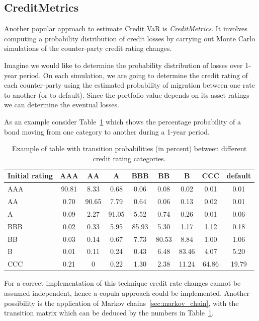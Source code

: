 \subsection{CreditMetrics}
Another popular approach to estimate Credit VaR is \emph{CreditMetrics}. It involves computing a probability distribution of credit losses by carrying out Monte Carlo simulations of the counter-party credit rating changes.

Imagine we would like to determine the probability distribution of losses over 1-year period. On each simulation, we are going to determine the credit rating of each counter-party using the estimated probability of migration between one rate to another (or to default). Since the portfolio value depends on its asset ratings we can determine the eventual losses. 

As an example consider Table~\ref{tab:credit_ratings} which shows the percentage probability of a bond moving from one category to another during a 1-year period.

\begin{table}[htb]
\centering
\begin{tabular}{|l|c|c|c|c|c|c|c|c|}
\hline
Initial rating & AAA & AA & A & BBB & BB & B & CCC & default \\
\hline
\hline
AAA & 90.81 & 8.33 & 0.68 & 0.06 & 0.08 & 0.02 & 0.01& 0.01 \\ 
\hline
AA & 0.70 & 90.65 & 7.79 & 0.64 & 0.06 & 0.13 & 0.02 & 0.01 \\ 
\hline
A & 0.09 & 2.27 & 91.05 & 5.52 & 0.74 & 0.26 & 0.01 & 0.06 \\ 
\hline
BBB & 0.02 & 0.33 & 5.95 & 85.93 & 5.30 & 1.17 & 1.12 & 0.18 \\
\hline
BB & 0.03 & 0.14 & 0.67 & 7.73 & 80.53 & 8.84 & 1.00 & 1.06 \\
\hline
B & 0.01 & 0.11 & 0.24 & 0.43 & 6.48 & 83.46 & 4.07 & 5.20 \\
\hline
CCC & 0.21 & 0 & 0.22 & 1.30 & 2.38 & 11.24 & 64.86 & 19.79 \\		
\hline
\end{tabular}
\caption{Example of table with transition probabilities (in percent) between different credit rating categories.}
\label{tab:credit_ratings}
\end{table}

For a correct implementation of this technique credit rate changes cannot be assumed independent, hence a copula approach could be implemented.
Another possibility is the application of Markov chains~\ref{sec:markov_chain}, with the transition matrix which can be deduced by the numbers in Table~\ref{tab:credit_ratings}.


